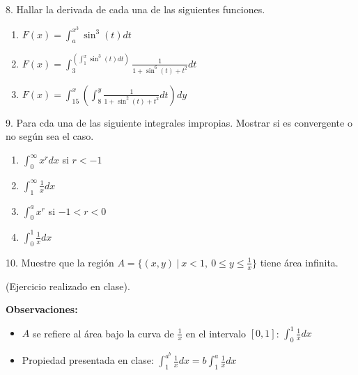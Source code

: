 \documentclass[12pt]{article}
\begin{document}
8. Hallar la derivada de cada una de las siguientes funciones.

\begin{enumerate}[\hspace{9px} a)]
    \item \(F(x)=\displaystyle\int_{a}^{x^3}\sin^3(t)dt\)

    \item \(F(x)=\displaystyle\int_{3}^{\left(\displaystyle\int_{1}^{x}\sin^3(t)dt\right)}\frac{1}{1+\sin^6(t)+t^2}dt\)

    \item \(F(x)=\displaystyle\int_{15}^{x}\left(\int_{8}^{y}\frac{1}{1+\sin^2(t)+t^2}dt\right)dy\)

\end{enumerate}

9. Para cda una de las siguiente integrales impropias. Mostrar si es convergente o no seg\'un sea el caso.

\begin{enumerate}[\hspace{9px} a)]
    \item \(\displaystyle\int_{0}^{\infty}x^rdx\) si $r<-1$

    \item \(\displaystyle\int_{1}^{\infty}\frac{1}{x}dx\)

    \item \(\displaystyle\int_{0}^{a}x^r\) si $-1<r<0$

    \item \(\displaystyle\int_{0}^{1}\frac{1}{x}dx\)

\end{enumerate}

10. Muestre que la regi\'on \(A=\{(x,y) \ | \ x<1, \ 0 \leq y \leq \frac{1}{x}\}\) tiene \'area infinita.\medskip

(Ejercicio realizado en clase).\bigskip

\textbf{Observaciones:}\medskip
\begin{itemize}
    \item $A$ se refiere al \'area bajo la curva de \(\displaystyle\frac{1}{x}\) en el intervalo $[0,1]$: \quad \(\displaystyle\int_0^1\frac{1}{x}dx\)
    \item Propiedad presentada en clase: \(\displaystyle\int_1^{\displaystyle a^b}\frac{1}{x}dx = b\int_1^a\frac{1}{x}dx\)\bigskip
\end{itemize}
\end{document}
